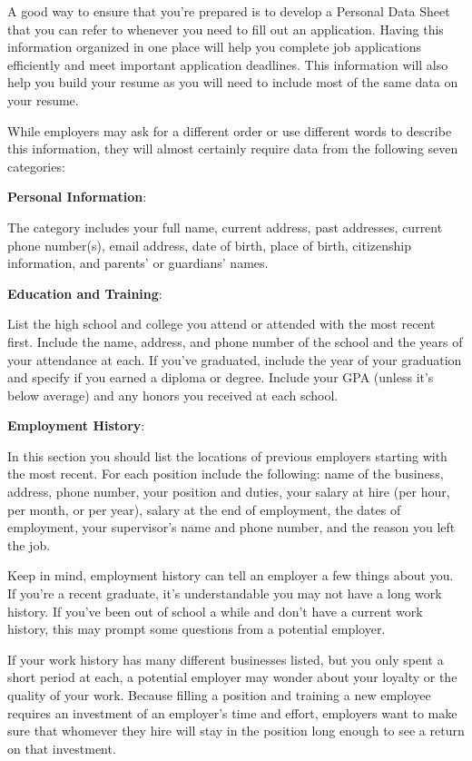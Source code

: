 A good way to ensure that you're prepared is to develop a Personal Data Sheet that you can refer to whenever you need to fill out an application. Having this information organized in one place will help you complete job applications efficiently and meet important application deadlines. This information will also help you build your resume as you will need to include most of the same data on your resume.

While employers may ask for a different order or use different words to describe this information, they will almost certainly require data from the following seven categories:

\textbf{Personal Information}:

The category includes your full name, current address, past addresses, current phone number(s), email address, date of birth, place of birth, citizenship information, and parents' or guardians' names.

\textbf{Education and Training}: 

List the high school and college you attend or attended with the most recent first. Include the name, address, and phone number of the school and the years of your attendance at each. If you've graduated, include the year of your graduation and specify if you earned a diploma or degree. Include your GPA (unless it’s below average) and any honors you received at each school.

\textbf{Employment History}: 

In this section you should list the locations of previous employers starting with the most recent. For each position include the following: name of the business, address, phone number, your position and duties, your salary at hire (per hour, per month, or per year), salary at the end of employment, the dates of employment, your supervisor's name and phone number, and the reason you left the job.

Keep in mind, employment history can tell an employer a few things about you. If you're a recent graduate, it's understandable you may not have a long work history. If you've been out of school a while and don't have a current work history, this may prompt some questions from a potential employer.

If your work history has many different businesses listed, but you only spent a short period at each, a potential employer may wonder about your loyalty or the quality of your work. Because filling a position and training a new employee requires an investment of an employer's time and effort, employers want to make sure that whomever they hire will stay in the position long enough to see a return on that investment.

